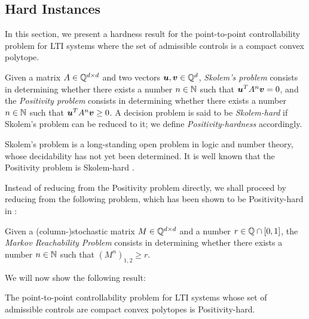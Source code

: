 \subsection{Hard Instances}

In this section, we present a hardness result for the point-to-point controllability problem for LTI systems where the set of admissible controls is a compact convex polytope.

\begin{definition}
Given a matrix $A \in \mathbb{Q}^{d \times d}$ and two vectors
$\boldsymbol{u}, \boldsymbol{v} \in \mathbb{Q}^{d}$, \emph{Skolem's problem} consists in determining
whether there exists a number $n \in \mathbb{N}$ such that
$\boldsymbol{u}^{T} A^{n} \boldsymbol{v} = 0$, and the \emph{Positivity problem} consists in determining whether there exists a number $n \in \mathbb{N}$ such that $\boldsymbol{u}^{T} A^{n} \boldsymbol{v} \geq 0$. A decision problem is said to be \emph{Skolem-hard} if Skolem's problem can be reduced to it; we define \emph{Positivity-hardness} accordingly.
\end{definition}

Skolem's problem is a long-standing open problem in logic and number theory, whose decidability has not yet been determined. It is well known that the Positivity problem is Skolem-hard \cite{OW14:SODA}.

Instead of reducing from the Positivity problem directly, we shall proceed by reducing from the following problem, which has been shown to be Positivity-hard in \cite{MRP}:
\begin{definition}
Given a (column-)stochastic matrix $M \in \mathbb{Q}^{d \times d}$ and a number $r \in \mathbb{Q} \cap [0,1]$,
the \emph{Markov Reachability Problem} consists in determining whether there exists a number $n \in \mathbb{N}$ such that $\left( M^{n} \right)_{1,2} \geq r$.
\end{definition}

We will now show the following result:

\begin{theorem}
The point-to-point controllability problem for LTI systems whose set of admissible controls are compact convex polytopes is Positivity-hard.
\end{theorem}

